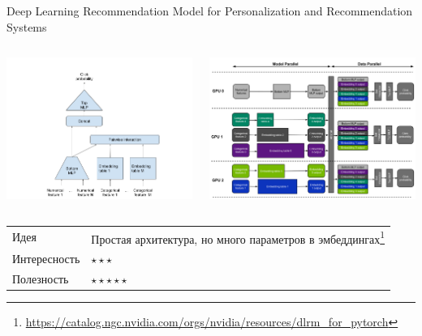 \documentclass[11pt,aspectratio=169,handout]{beamer}
\begin{document}
\begin{frame}{Deep Learning Recommendation Model for Personalization and Recommendation Systems \cite{DLRM}}

\begin{columns}
\begin{column}{0.25\textwidth} 
\begin{center}
\includegraphics[scale=0.15]{images/dlrm-arch.png}
\end{center}
\end{column}
\begin{column}{0.65\textwidth}
\begin{center}
\includegraphics[scale=0.1]{images/dlrm-parallel.png}
\end{center}
\end{column}
\end{columns}

\vfill
\begin{small}
\begin{tabular}{l l}
Идея & Простая архитектура, но много параметров в эмбеддингах\footnote{\url{https://catalog.ngc.nvidia.com/orgs/nvidia/resources/dlrm_for_pytorch}} \\
Интересность & $\star\star\star$ \\
Полезность & $\star\star\star\star\star$
\end{tabular}
\end{small}

\end{frame}
\end{document}
